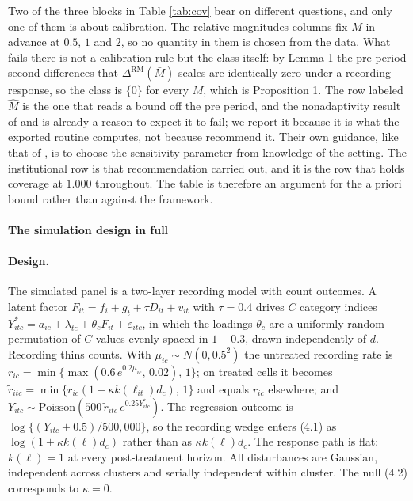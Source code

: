 \documentclass[12pt]{article}
\theoremstyle{definition}
\numberwithin{equation}{section}
\begin{document}
Two of the three blocks in Table \ref{tab:cov} bear on different questions, and
only one of them is about calibration. The relative magnitudes columns fix
$\bar M$ in advance at $0.5$, $1$ and $2$, so no quantity in them is chosen from
the data. What fails there is not a calibration rule but the class itself: by
Lemma 1 the pre-period second differences that
$\Delta^{\mathrm{RM}}(\bar M)$ scales are identically zero under a recording
response, so the class is $\{0\}$ for every $\bar M$, which is Proposition
1. The row labeled $\widehat M$ is the one that reads a bound off
the pre period, and the nonadaptivity result of \citet{low1997nonparametric} and
\citet{cailow2004adaptation} is already a reason to expect it to fail; we report
it because it is what the exported routine computes, not because
\citet{rambachan2023credible} recommend it. Their own guidance, like that of
\citet{armstrong2020simple}, is to choose the sensitivity parameter from
knowledge of the setting. The institutional row is that recommendation carried
out, and it is the row that holds coverage at $1.000$ throughout. The table is
therefore an argument for the a priori bound rather than against the framework.

\paragraph{The simulation design in full}

\paragraph{Design.} The simulated panel is a two-layer recording model with
count outcomes. A latent factor $F_{it} = f_i + g_t + \tau D_{it} + v_{it}$
with $\tau = 0.4$ drives $C$ category indices $Y^*_{itc} = a_{ic} +
\lambda_{tc} + \theta_c F_{it} + \varepsilon_{itc}$, in which the loadings
$\theta_c$ are a uniformly random permutation of $C$ values evenly spaced in
$1 \pm 0.3$, drawn independently of $d$. Recording thins counts. With
$\mu_{ic} \sim N(0, 0.5^2)$ the untreated recording rate is $r_{ic} =
\min\{\max(0.6\, e^{0.2\mu_{ic}},\, 0.02),\, 1\}$; on treated cells it becomes
$\tilde{r}_{itc} = \min\{r_{ic}(1 + \kappa k(\ell_{it}) d_c),\, 1\}$ and equals
$r_{ic}$ elsewhere; and $Y_{itc} \sim \mathrm{Poisson}(500\, \tilde{r}_{itc}\,
e^{0.25 Y^*_{itc}})$. The regression outcome is
$\log\{(Y_{itc}+0.5)/500{,}000\}$, so the recording wedge enters
(4.1) as $\log(1 + \kappa k(\ell) d_c)$ rather than as
$\kappa k(\ell) d_c$. The response path is flat: $k(\ell) = 1$ at every
post-treatment horizon. All disturbances are Gaussian, independent across
clusters and serially independent within cluster. The null (4.2)
corresponds to $\kappa = 0$.
\end{document}
